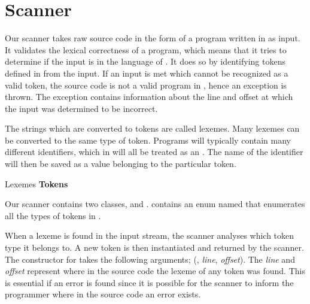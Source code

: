 \section{Scanner}
Our scanner takes raw source code in the form of a program written in \productname{} as input. It validates the lexical correctness of a \productname{} program, which means that it tries to determine if the input is in the language of \productname{}. It does so by identifying tokens defined in \productname{} from the input. If an input is met which cannot be recognized as a valid token, the source code is not a valid program in \productname{}, hence an exception is thrown. The exception contains information about the line and offset at which the input was determined to be incorrect.

The strings which are converted to tokens are called lexemes. Many lexemes can be converted to the same type of token. Programs will typically contain many different identifiers, which in \productname{} will all be treated as an . The name of the identifier will then be saved as a value belonging to the particular token.

                 {						}
       {Lexemes	}{\textbf{Tokens}		}{
\tabrow{$[$    	}{ LBRACKET				}
\tabrow{$]$		}{ RBRACKET 			}
}

Our scanner contains two classes,  and .  contains an enum named  that enumerates all the types of tokens in \productname{}. 

When a lexeme is found in the input stream, the scanner analyses which token type it belongs to. A new token is then instantiated and returned by the scanner. The constructor for  takes the following arguments; (, \textit{line}, \textit{offset}). The \textit{line} and \textit{offset} represent where in the source code the lexeme of any token was found. This is essential if an error is found since it is possible for the scanner to inform the programmer where in the source code an error exists.

